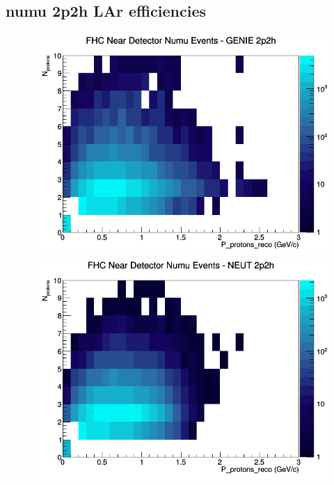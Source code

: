 \subsection{numu 2p2h LAr efficiencies}
\begin{figure}[h]
\includegraphics[width=\linewidth]{eff_N_P/LAr/protons/2p2h_FHC_ND_numu_N_P_GENIE.png}
\endminipage
{}
\includegraphics[width=\linewidth]{eff_N_P/LAr/protons/2p2h_FHC_ND_numu_N_P_NEUT.png}
\endminipage
{}

\end{figure}
